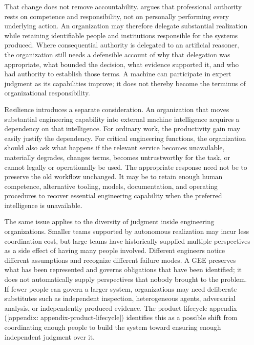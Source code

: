 That change does not remove accountability.  argues that professional authority rests on competence and responsibility, not on personally performing every underlying action. An organization may therefore delegate substantial realization while retaining identifiable people and institutions responsible for the systems produced. Where consequential authority is delegated to an artificial reasoner, the organization still needs a defensible account of why that delegation was appropriate, what bounded the decision, what evidence supported it, and who had authority to establish those terms. A machine can participate in expert judgment as its capabilities improve; it does not thereby become the terminus of organizational responsibility.

Resilience introduces a separate consideration. An organization that moves substantial engineering capability into external machine intelligence acquires a dependency on that intelligence. For ordinary work, the productivity gain may easily justify the dependency. For critical engineering functions, the organization should also ask what happens if the relevant service becomes unavailable, materially degrades, changes terms, becomes untrustworthy for the task, or cannot legally or operationally be used. The appropriate response need not be to preserve the old workflow unchanged. It may be to retain enough human competence, alternative tooling, models, documentation, and operating procedures to recover essential engineering capability when the preferred intelligence is unavailable.

The same issue applies to the diversity of judgment inside engineering organizations. Smaller teams supported by autonomous realization may incur less coordination cost, but large teams have historically supplied multiple perspectives as a side effect of having many people involved. Different engineers notice different assumptions and recognize different failure modes. A GEE preserves what has been represented and governs obligations that have been identified; it does not automatically supply perspectives that nobody brought to the problem. If fewer people can govern a larger system, organizations may need deliberate substitutes such as independent inspection, heterogeneous agents, adversarial analysis, or independently produced evidence. The product-lifecycle appendix ({[}appendix: appendix-product-lifecycle{]}) identifies this as a possible shift from coordinating enough people to build the system toward ensuring enough independent judgment over it.
